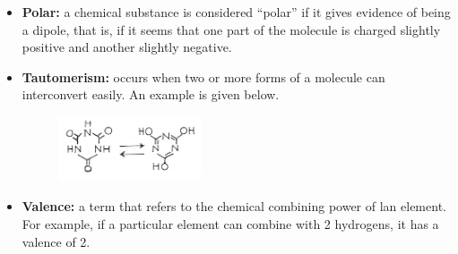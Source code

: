\documentclass[11pt]{memoir}
\begin{document}
\begin{itemize}
\item[]{\textbf{Polar:} a chemical substance is considered ``polar'' if it gives evidence of being a dipole, that is, if it seems that one part of the molecule is charged slightly positive and another slightly negative.}

\item[]{\textbf{Tautomerism:} occurs when two or more forms of a molecule can interconvert easily.  An example is given below.}

\begin{figure}[h]
\vspace{-10pt}
\begin{center}
\includegraphics[width=0.4\textwidth]{images/lewis_notefig9.png}
\end{center}
\vspace{-30pt}
\end{figure}


\item[]{\textbf{Valence:} a term that refers to the chemical combining power of lan element.  For example, if a particular element can combine with 2 hydrogens, it has a valence of 2.}


\newpage


\end{itemize}
\end{document}
